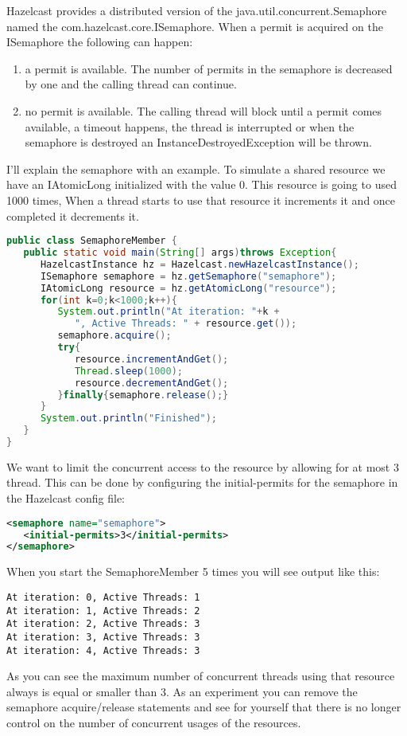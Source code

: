 Hazelcast provides a distributed version of the java.util.concurrent.Semaphore named the com.hazelcast.core.ISemaphore. When a permit is acquired on the ISemaphore the following can happen:
\begin{enumerate}
\item a permit is available. The number of permits in the semaphore is decreased by one and the calling thread can continue. 
\item no permit is available. The calling thread will block until a permit comes available, a timeout happens, the thread is interrupted or when the semaphore is destroyed an InstanceDestroyedException will be thrown.
\end{enumerate}
I'll explain the semaphore with an example. To simulate a shared resource we have an IAtomicLong initialized with the value 0. This resource is going to used 1000 times, When a thread starts to use that resource it increments it and once completed it decrements it.
\begin{lstlisting}[language=java]
public class SemaphoreMember {
   public static void main(String[] args)throws Exception{
      HazelcastInstance hz = Hazelcast.newHazelcastInstance();
      ISemaphore semaphore = hz.getSemaphore("semaphore");
      IAtomicLong resource = hz.getAtomicLong("resource");
      for(int k=0;k<1000;k++){
         System.out.println("At iteration: "+k +
            ", Active Threads: " + resource.get());
         semaphore.acquire();
         try{
            resource.incrementAndGet();
            Thread.sleep(1000);
            resource.decrementAndGet();
         }finally{semaphore.release();}
      }
      System.out.println("Finished");
   }
}
\end{lstlisting}
We want to limit the concurrent access to the resource by allowing for at most 3 thread. This can be done by configuring the initial-permits for the semaphore in the Hazelcast config file:
\begin{lstlisting}[language=xml]
<semaphore name="semaphore">
   <initial-permits>3</initial-permits>
</semaphore>
\end{lstlisting}
When you start the SemaphoreMember 5 times you will see output like this:
\begin{lstlisting}
At iteration: 0, Active Threads: 1
At iteration: 1, Active Threads: 2
At iteration: 2, Active Threads: 3
At iteration: 3, Active Threads: 3
At iteration: 4, Active Threads: 3
\end{lstlisting}
As you can see the maximum number of concurrent threads using that resource always is equal or smaller than 3. As an experiment you can remove the semaphore acquire/release statements and see for yourself that there is no longer control on the number of concurrent usages of the resources.

